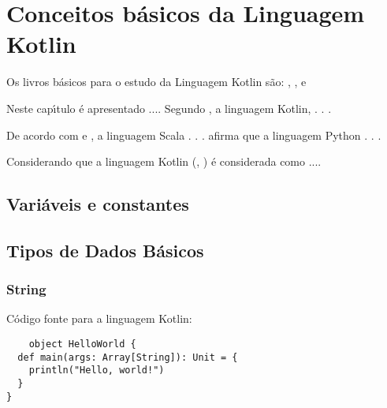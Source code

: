 

\chapter{ Conceitos b\'{a}sicos da Linguagem Kotlin}

Os livros b\'{a}sicos para o estudo da Linguagem Kotlin s\~{a}o: \cite{Whaling2020}, \cite{Wampler2021}, \cite{Hunt2018} e \cite{Upadhyaya2019}

Neste cap\'{\i}tulo \'{e} apresentado ....  Segundo \cite{Hunt2018}, a linguagem Kotlin,  . . .

De acordo com \cite{Sebesta2018} e \cite{roy04}, a linguagem Scala . . . \cite{Sebesta2018} afirma que a linguagem Python . . .

Considerando que a linguagem Kotlin (\cite{Whaling2020}, \cite{Upadhyaya2019}) \'{e} considerada como ....

    \section{Vari\'{a}veis e constantes}


    \section{Tipos de Dados B\'{a}sicos}

            \subsection{String}

    C\'{o}digo fonte para a linguagem Kotlin:
    \begin{lstlisting}
    object HelloWorld {
  def main(args: Array[String]): Unit = {
    println("Hello, world!")
  }
}
    \end{lstlisting}

